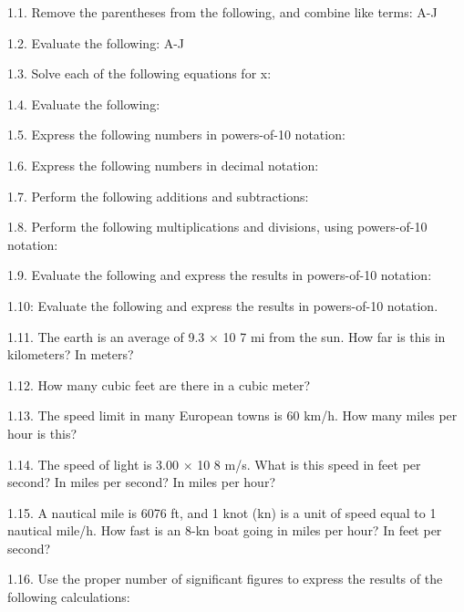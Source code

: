 






1.1. Remove the parentheses from the following, and combine like terms:
A-J

1.2. Evaluate the following:
A-J

1.3. Solve each of the following equations for x:


1.4. Evaluate the following:


1.5. Express the following numbers in powers-of-10 notation:


1.6. Express the following numbers in decimal notation:


1.7. Perform the following additions and subtractions:


1.8. Perform the following multiplications and divisions, using powers-of-10 notation:

1.9. Evaluate the following and express the results in powers-of-10 notation:

1.10: Evaluate the following and express the results in powers-of-10 notation.

1.11. The earth is an average of 9.3 × 10 7 mi from the sun. How far is this in kilometers? In meters?

1.12. How many cubic feet are there in a cubic meter?

1.13. The speed limit in many European towns is 60 km/h. How many miles per hour is this?

1.14. The speed of light is 3.00 × 10 8 m/s. What is this speed in feet per second? In miles per second? In miles per hour?

1.15. A nautical mile is 6076 ft, and 1 knot (kn) is a unit of speed equal to 1 nautical mile/h. 
How fast is an 8-kn boat going in miles per hour? 
In feet per second?

1.16. Use the proper number of significant figures to express the results of the following calculations:



\endinput


